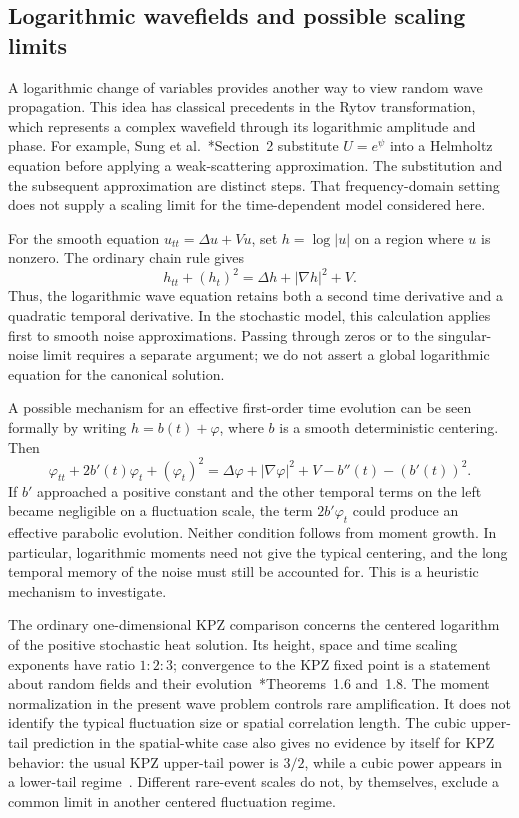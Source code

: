 \subsection{Logarithmic wavefields and possible scaling limits}
\label{S:future-universality}

A logarithmic change of variables provides another way to view random wave
propagation. This idea has classical precedents in the Rytov transformation,
which represents a complex wavefield through its logarithmic amplitude and
phase. For example, Sung et al.~\cite{sung.choi.ea:09:optical}*{Section~2}
substitute $U=e^\psi$ into a Helmholtz equation before applying a
weak-scattering approximation. The substitution and the subsequent
approximation are distinct steps. That frequency-domain setting does not
supply a scaling limit for the time-dependent model considered here.

For the smooth equation $u_{tt}=\Delta u+Vu$, set $h=\log|u|$ on a region where
$u$ is nonzero. The ordinary chain rule gives
\begin{equation}\label{E:future-log-wave}
  h_{tt}+(h_t)^2=\Delta h+|\nabla h|^2+V.
\end{equation}
Thus, the logarithmic wave equation retains both a second time derivative and
a quadratic temporal derivative. In the stochastic model, this calculation
applies first to smooth noise approximations. Passing through zeros or to the
singular-noise limit requires a separate argument; we do not assert a global
logarithmic equation for the canonical solution.

A possible mechanism for an effective first-order time evolution can be seen
formally by writing $h=b(t)+\varphi$, where $b$ is a smooth deterministic
centering. Then
\begin{equation}\label{E:future-centered-log-wave}
  \varphi_{tt}+2b'(t)\varphi_t+(\varphi_t)^2
  =\Delta\varphi+|\nabla\varphi|^2+V-b''(t)-(b'(t))^2.
\end{equation}
If $b'$ approached a positive constant and the other temporal terms on the
left became negligible on a fluctuation scale, the term $2b'\varphi_t$ could
produce an effective parabolic evolution. Neither condition follows from
moment growth. In particular, logarithmic moments need not give the typical
centering, and the long temporal memory of the noise must still be accounted
for. This is a heuristic mechanism to investigate.

The ordinary one-dimensional KPZ comparison concerns the centered logarithm
of the positive stochastic heat solution. Its height, space and time scaling
exponents have ratio $1:2:3$; convergence to the KPZ fixed point is a statement about
random fields and their evolution~\cite{wu:26:kpz}*{Theorems~1.6 and~1.8}. The moment normalization
in the present wave problem controls rare amplification. It does not identify
the typical fluctuation size or spatial correlation length. The cubic
upper-tail prediction in the spatial-white case also gives no evidence by
itself for KPZ behavior: the usual KPZ upper-tail power is $3/2$, while a
cubic power appears in a lower-tail regime~\cite{corwin.ghosal:20:kpz}.
Different rare-event scales do not, by themselves, exclude a common limit in
another centered fluctuation regime.

